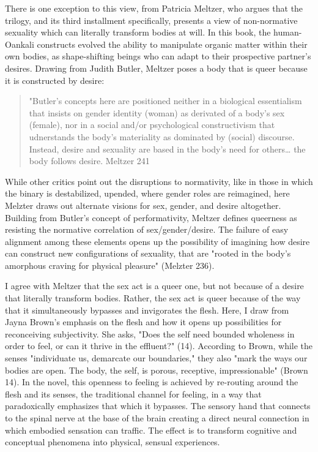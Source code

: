 \documentclass[11pt]{article}
\begin{document}
\begin{enumerate}
There is one exception to this view, from Patricia Meltzer, who argues
that the trilogy, and its third installment specifically, presents a
view of non-normative sexuality which can literally transform bodies
at will. In this book, the human-Oankali constructs evolved the
ability to manipulate organic matter within their own bodies, as
shape-shifting beings who can adapt to their prospective partner's
desires. Drawing from Judith Butler, Meltzer poses a body that is
queer because it is constructed by desire:
\begin{quote}
"Butler's concepts here are positioned neither in a biological
essentialism that insists on gender identity (woman) as derivated of a
body's sex (female), nor in a social and/or psychological
constructivism that udnerstands the body's materiality as dominated by
(social) discourse. Instead, desire and sexuality are based in the
body's need for others\ldots{} the body follows desire. Meltzer 241
\end{quote}
While other critics point out the disruptions to normativity, like in
those in which the binary is destabilized, upended, where gender roles
are reimagined, here Melzter draws out alternate visions for sex,
gender, and desire altogether. Building from Butler's concept of
performativity, Meltzer defines queerness as resisting the normative
correlation of sex/gender/desire. The failure of easy alignment among
these elements opens up the possibility of imagining how desire can
construct new configurations of sexuality, that are "rooted in the
body's amorphous craving for physical pleasure" (Melzter 236).

I agree with Meltzer that the sex act is a queer one, but not because
of a desire that literally transform bodies. Rather, the sex act is
queer because of the way that it simultaneously bypasses and
invigorates the flesh. Here, I draw from Jayna Brown's emphasis on the
flesh and how it opens up possibilities for reconceiving
subjectivity. She asks, "Does the self need bounded wholeness in order
to feel, or can it thrive in the effluent?" (14). According to Brown,
while the senses "individuate us, demarcate our boundaries," they also
"mark the ways our bodies are open. The body, the self, is porous,
receptive, impressionable" (Brown 14). In the novel, this openness to
feeling is achieved by re-routing around the flesh and its senses, the
traditional channel for feeling, in a way that paradoxically
emphasizes that which it bypasses. The sensory hand that connects to
the spinal nerve at the base of the brain creating a direct neural
connection in which embodied sensation can traffic. The effect is to
transform cognitive and conceptual phenomena into physical, sensual
experiences.


\end{enumerate}
\end{document}
